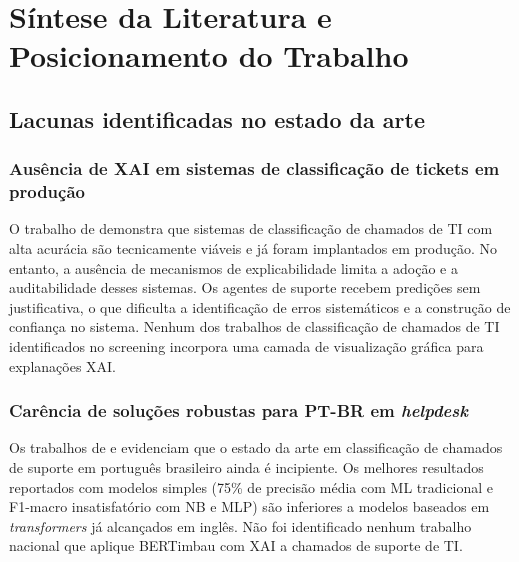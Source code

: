 \documentclass[
    12pt,                %
    openright,           %
    oneside,             %
    a4paper,             %
    english,             %
    brazil               %
]{abntex2}
\begin{document}
\section{Síntese da Literatura e Posicionamento do Trabalho}
\label{sec:sintese}

\subsection{Lacunas identificadas no estado da arte}
\label{subsec:sintese_lacunas}

\subsubsection{Ausência de XAI em sistemas de classificação de tickets em produção}
\label{subsubsec:lacuna_xai}

O trabalho de  demonstra que sistemas de classificação de chamados de TI com alta acurácia são tecnicamente viáveis e já foram implantados em produção. No entanto, a ausência de mecanismos de explicabilidade limita a adoção e a auditabilidade desses sistemas. Os agentes de suporte recebem predições sem justificativa, o que dificulta a identificação de erros sistemáticos e a construção de confiança no sistema. Nenhum dos trabalhos de classificação de chamados de TI identificados no screening incorpora uma camada de visualização gráfica para explanações XAI.

\subsubsection{Carência de soluções robustas para PT-BR em \textit{helpdesk}}
\label{subsubsec:lacuna_ptbr}

Os trabalhos de  e  evidenciam que o estado da arte em classificação de chamados de suporte em português brasileiro ainda é incipiente. Os melhores resultados reportados com modelos simples (75\% de precisão média com ML tradicional e F1-macro insatisfatório com NB e MLP) são inferiores a modelos baseados em \textit{transformers} já alcançados em inglês. Não foi identificado nenhum trabalho nacional que aplique BERTimbau com XAI a chamados de suporte de TI.

\end{document}
